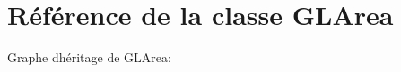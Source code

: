 \hypertarget{classGLArea}{}\section{Référence de la classe G\+L\+Area}
\label{classGLArea}


Graphe d\textquotesingle{}héritage de G\+L\+Area\+:
